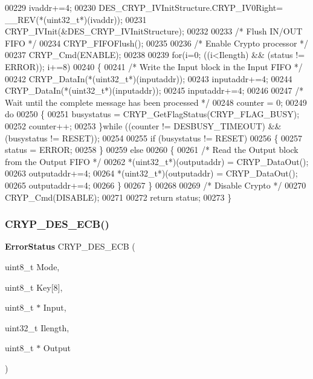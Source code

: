 \begin{DoxyCode}
00229   ivaddr+=4;
00230   DES\_CRYP\_IVInitStructure.CRYP_IV0Right= \_\_REV(*(uint32\_t*)(ivaddr));
00231   CRYP_IVInit(&DES\_CRYP\_IVInitStructure);
00232 
00233   \textcolor{comment}{/* Flush IN/OUT FIFO */}
00234   CRYP_FIFOFlush();
00235   
00236   \textcolor{comment}{/* Enable Crypto processor */}
00237   CRYP_Cmd(ENABLE);
00238 
00239   \textcolor{keywordflow}{for}(i=0; ((i<Ilength) && (status != ERROR)); i+=8)
00240   \{
00241     \textcolor{comment}{/* Write the Input block in the Input FIFO */}
00242     CRYP_DataIn(*(uint32\_t*)(inputaddr));
00243     inputaddr+=4;
00244     CRYP_DataIn(*(uint32\_t*)(inputaddr));
00245     inputaddr+=4;
00246 
00247     \textcolor{comment}{/* Wait until the complete message has been processed */}
00248     counter = 0;
00249     \textcolor{keywordflow}{do}
00250     \{
00251       busystatus = CRYP_GetFlagStatus(CRYP_FLAG_BUSY);
00252       counter++;
00253     \}\textcolor{keywordflow}{while} ((counter != DESBUSY_TIMEOUT) && (busystatus != RESET));
00254 
00255     \textcolor{keywordflow}{if} (busystatus != RESET)
00256    \{
00257        status = ERROR;
00258     \}
00259     \textcolor{keywordflow}{else}
00260     \{
00261       \textcolor{comment}{/* Read the Output block from the Output FIFO */}
00262       *(uint32\_t*)(outputaddr) = CRYP_DataOut();
00263       outputaddr+=4;
00264       *(uint32\_t*)(outputaddr) = CRYP_DataOut();
00265       outputaddr+=4;
00266     \}
00267   \}
00268 
00269   \textcolor{comment}{/* Disable Crypto */}
00270   CRYP_Cmd(DISABLE);
00271 
00272   \textcolor{keywordflow}{return} status; 
00273 \}
\end{DoxyCode}
\mbox{\label{group__CRYP__Group8_ga3b96b7608b39197209abed5f5845f590}} 
\subsubsection{C\+R\+Y\+P\+\_\+\+D\+E\+S\+\_\+\+E\+C\+B()}
{\footnotesize\ttfamily \textbf{ Error\+Status} C\+R\+Y\+P\+\_\+\+D\+E\+S\+\_\+\+E\+CB (\begin{DoxyParamCaption}\item[{uint8\+\_\+t}]{Mode,  }\item[{uint8\+\_\+t}]{Key[8],  }\item[{uint8\+\_\+t $\ast$}]{Input,  }\item[{uint32\+\_\+t}]{Ilength,  }\item[{uint8\+\_\+t $\ast$}]{Output }\end{DoxyParamCaption})}



